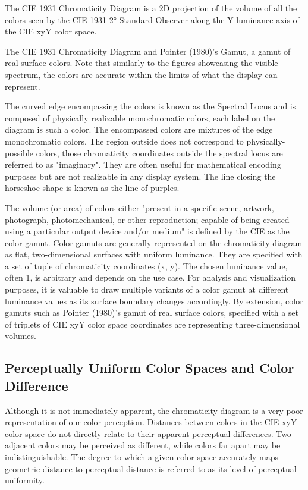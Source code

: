The CIE 1931 Chromaticity Diagram is a 2D projection of the volume of all the colors seen by the CIE 1931 2° Standard Observer along the Y luminance axis of the CIE xyY color space.

The CIE 1931 Chromaticity Diagram and Pointer (1980)'s Gamut, a gamut of real surface colors. Note that similarly to the figures showcasing the visible spectrum, the colors are accurate within the limits of what the display can represent.

The curved edge encompassing the colors is known as the Spectral Locus and is composed of physically realizable monochromatic colors, each label on the diagram is such a color. The encompassed colors are mixtures of the edge monochromatic colors. The region outside does not correspond to physically-possible colors, those chromaticity coordinates outside the spectral locus are referred to as "imaginary". They are often useful for mathematical encoding purposes but are not realizable in any display system. The line closing the horseshoe shape is known as the line of purples.

The volume (or area) of colors either "present in a specific scene, artwork, photograph, photomechanical, or other reproduction; capable of being created using a particular output device and/or medium" is defined by the CIE as the color gamut. Color gamuts are generally represented on the chromaticity diagram as flat, two-dimensional surfaces with uniform luminance. They are specified with a set of tuple of chromaticity coordinates (x, y). The chosen luminance value, often 1, is arbitrary and depends on the use case. For analysis and visualization purposes, it is valuable to draw multiple variants of a color gamut at different luminance values as its surface boundary changes accordingly. By extension, color gamuts such as Pointer (1980)'s gamut of real surface colors, specified with a set of triplets of CIE xyY color space coordinates are representing three-dimensional volumes.

\subsection{Perceptually Uniform Color Spaces and Color Difference}%
\label{subsec:perceptually-uniform-color-spaces-and-color-difference}

Although it is not immediately apparent, the chromaticity diagram is a very poor representation of our color perception. Distances between colors in the CIE xyY color space do not directly relate to their apparent perceptual differences. Two adjacent colors may be perceived as different, while colors far apart may be indistinguishable. The degree to which a given color space accurately maps geometric distance to perceptual distance is referred to as its level of perceptual uniformity.


